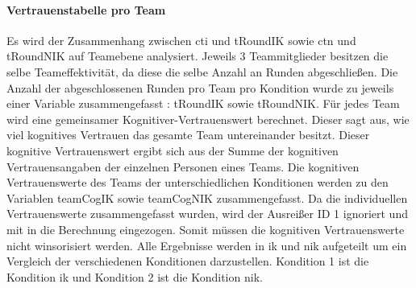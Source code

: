 \documentclass[a4paper,11pt]{article}%
\renewcommand{\\}{\vspace*{0.5\baselineskip} \newline}
\begin{document}
\paragraph{Vertrauenstabelle pro Team}
Es wird der Zusammenhang zwischen \ac{cti} und \ac{tRoundIK} sowie \ac{ctn} und \ac{tRoundNIK} auf Teamebene analysiert.
Jeweils 3 Teammitglieder besitzen die selbe Teameffektivität, da diese die selbe Anzahl an Runden abgeschließen. Die Anzahl der abgeschlossenen Runden pro Team pro Kondition wurde zu jeweils einer Variable zusammengefasst : \ac{tRoundIK} sowie \ac{tRoundNIK}. Für jedes Team wird eine gemeinsamer Kognitiver-Vertrauenswert berechnet. Dieser sagt aus, wie viel kognitives Vertrauen das gesamte Team untereinander besitzt. Dieser kognitive Vertrauenswert ergibt sich aus der Summe der kognitiven Vertrauensangaben der einzelnen Personen eines Teams. Die kognitiven Vertrauenswerte des Teams der unterschiedlichen Konditionen werden zu den Variablen \ac{teamCogIK} sowie \ac{teamCogNIK} zusammengefasst.
Da die individuellen Vertrauenswerte zusammengefasst wurden, wird der Ausreißer \dq{}ID 1\dq{} ignoriert und mit in die Berechnung eingezogen. Somit müssen die kognitiven Vertrauenswerte nicht winsorisiert werden. Alle Ergebnisse werden in \ac{ik} und \ac{nik} aufgeteilt um ein Vergleich der verschiedenen Konditionen darzustellen. Kondition 1 ist die Kondition \ac{ik} und Kondition 2 ist die Kondition \ac{nik}.
\end{document}
